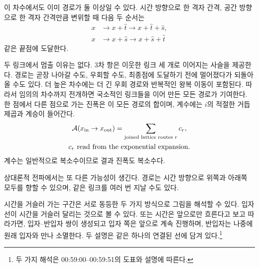 이 차수에서도 이미 경로가 둘 이상일 수 있다. 시간 방향으로 한 격자 간격, 공간 방향으로 한 격자 간격만큼 변위할 때 다음 두 순서는\begin{align}
x
&\longrightarrow x+\hat t
\longrightarrow x+\hat t+\hat s,\\
x
&\longrightarrow x+\hat s
\longrightarrow x+\hat s+\hat t
\end{align}같은 끝점에 도달한다.

\begin{classroomqa}
\end{classroomqa}

두 링크에서 멈출 이유는 없다. 3차 항은 이웃한 링크 세 개로 이어지는 사슬을 제공한다. 경로는 곧장 나아갈 수도, 우회할 수도, 최종점에 도달하기 전에 멀어졌다가 되돌아올 수도 있다. 더 높은 차수에는 더 긴 우회 경로와 반복적인 왕복 이동이 포함된다. 따라서 임의의 차수까지 전개하면 국소적인 링크들을 이어 만든 모든 경로가 기여한다. 한 점에서 다른 점으로 가는 진폭은 이 모든 경로의 합이며, 계수에는 \(i\)의 적절한 거듭제곱과 계승이 들어간다.\begin{equation}
\begin{gathered}
\mathcal{A}(x_{\mathrm{in}}\to x_{\mathrm{out}})
=
\sum_{\text{joined lattice routes }r}c_r,
\\
c_r\ \hbox{read from the exponential expansion}.
\end{gathered}
\end{equation}계수는 일반적으로 복소수이므로 결과 진폭도 복소수다.

상대론적 전파에서는 또 다른 가능성이 생긴다. 경로는 시간 방향으로 위쪽과 아래쪽 모두를 향할 수 있으며, 같은 링크를 여러 번 지날 수도 있다.

\begin{classroomqa}
\end{classroomqa}

시간을 거슬러 가는 구간은 서로 동등한 두 가지 방식으로 그림을 해석할 수 있다. 입자 선이 시간을 거슬러 달리는 것으로 볼 수 있다. 또는 시간은 앞으로만 흐른다고 보고 따라가면, 입자--반입자 쌍이 생성되고 입자 쪽은 앞으로 계속 진행하며, 반입자는 나중에 원래 입자와 만나 소멸한다. 두 설명은 같은 하나의 연결된 선에 담겨 있다.\footnote{두 가지 해석은 00:59:00--00:59:51의 도표와 설명에 따른다.}

